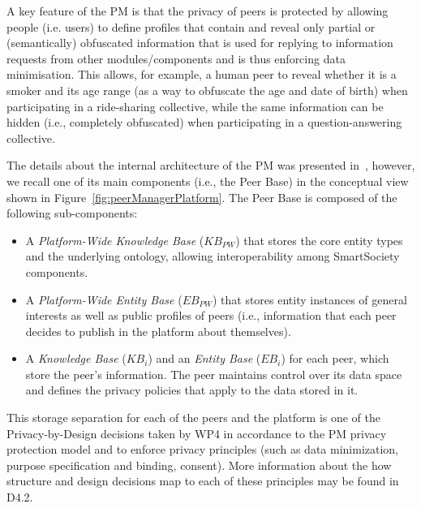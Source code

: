 A key feature of the PM is that the privacy of peers is protected by allowing people (i.e. users) to define profiles that contain and reveal only partial or (semantically) obfuscated information that is used for replying to information requests from other modules/components and is thus enforcing data minimisation. 
This allows, for example, a human peer to reveal whether it is a smoker and its age range (as a way to obfuscate the age and date of birth) when participating in a ride-sharing collective, while the same information can be hidden (i.e., completely obfuscated) when participating in a question-answering collective.

The details about the internal architecture of the PM was presented in~\cite{D4.2,Hartswood:2015fe}, however, we recall one of its main components (i.e., the Peer Base) in the conceptual view shown in Figure~\ref{fig:peerManagerPlatform}. The Peer Base is composed of the following sub-components: 
\begin{itemize}
\item A \emph{Platform-Wide Knowledge Base} (${KB}_{PW}$) that stores the core entity types and the underlying ontology, allowing interoperability among SmartSociety components. 
\item A \emph{Platform-Wide Entity Base} (${EB}_{PW}$) that stores entity instances of general interests as well as public profiles of peers (i.e., information that each peer decides to publish in the platform about themselves).
\item A \emph{Knowledge Base} (${KB}_i$) and an \emph{Entity Base} (${EB}_i$) for each peer, which store the peer’s information. The peer maintains control over its data space and defines the privacy policies that apply to the data stored in it. 
\end{itemize}
This storage separation for each of the peers and the platform is one of the Privacy-by-Design decisions taken by WP4 in accordance to the PM  privacy protection model and to enforce privacy principles (such as data minimization, purpose specification and binding, consent). More information about the how structure and design decisions map to each of these principles may be found in D4.2.

